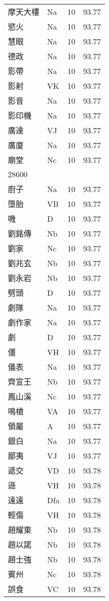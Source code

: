 \documentclass[twocolumn]{book}
\begin{document}
\begin{supertabular}{llrr}
摩天大樓 & Na & 10 &  93.77\\
慾火 & Na & 10 &  93.77\\
慧眼 & Na & 10 &  93.77\\
德政 & Na & 10 &  93.77\\
影帶 & Na & 10 &  93.77\\
影射 & VK & 10 &  93.77\\
影音 & Na & 10 &  93.77\\
影印機 & Na & 10 &  93.77\\
廣達 & VJ & 10 &  93.77\\
廣廈 & Na & 10 &  93.77\\
廟堂 & Nc & 10 &  93.77\\
28600\\
廚子 & Na & 10 &  93.77\\
墮胎 & VB & 10 &  93.77\\
嘰 & D & 10 &  93.77\\
劉銘傳 & Nb & 10 &  93.77\\
劉家 & Nc & 10 &  93.77\\
劉兆玄 & Nb & 10 &  93.77\\
劉永岩 & Nb & 10 &  93.77\\
劈頭 & D & 10 &  93.77\\
劇隊 & Na & 10 &  93.77\\
劇作家 & Na & 10 &  93.77\\
劇 & D & 10 &  93.77\\
僵 & VH & 10 &  93.77\\
儀表 & Na & 10 &  93.77\\
齊宣王 & Nb & 10 &  93.77\\
鳳山溪 & Nc & 10 &  93.77\\
鳴槍 & VA & 10 &  93.77\\
領屬 & A & 10 &  93.77\\
銀白 & Na & 10 &  93.77\\
鄙夷 & VJ & 10 &  93.77\\
遞交 & VD & 10 &  93.78\\
遜 & VH & 10 &  93.78\\
遠遠 & Dfa & 10 &  93.78\\
輕傷 & VH & 10 &  93.78\\
趙耀東 & Nb & 10 &  93.78\\
趙以諾 & Nb & 10 &  93.78\\
趙士強 & Nb & 10 &  93.78\\
賓州 & Nc & 10 &  93.78\\
誤食 & VC & 10 &  93.78\\

\end{supertabular}
\end{document}
